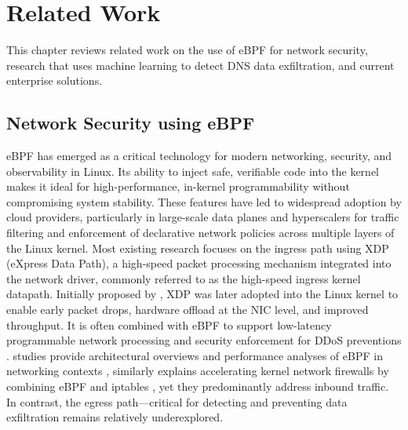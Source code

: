 \documentclass [11pt, proquest] {uwthesis}[2020/02/24]
\begin{document}
\chapter {Related Work}
This chapter reviews related work on the use of eBPF for network security, research that uses machine learning to detect DNS data exfiltration, and current enterprise solutions.

\section{Network Security using eBPF}
eBPF has emerged as a critical technology for modern networking, security, and observability in Linux. Its ability to inject safe, verifiable code into the kernel makes it ideal for high-performance, in-kernel programmability without compromising system stability. These features have led to widespread adoption by cloud providers, particularly in large-scale data planes and hyperscalers for traffic filtering and enforcement of declarative network policies across multiple layers of the Linux kernel. Most existing research focuses on the ingress path using XDP (eXpress Data Path), a high-speed packet processing mechanism integrated into the network driver, commonly referred to as the high-speed ingress kernel datapath. Initially proposed by \citeauthor{10.1145/3281411.3281443}, XDP was later adopted into the Linux kernel to enable early packet drops, hardware offload at the NIC level, and improved throughput. It is often combined with eBPF to support low-latency programmable network processing and security enforcement for DDoS preventions \cite{10.1145/3281411.3281443, 8850758}.
\citeauthor{10.1145/3371038} studies provide architectural overviews and performance analyses of eBPF in networking contexts \cite{10.1145/3371038}, similarly \citeauthor{bertrone2018accelerating} explains accelerating kernel network firewalls by combining eBPF and iptables \cite{bertrone2018accelerating}, yet they predominantly address inbound traffic. In contrast, the egress path—critical for detecting and preventing data exfiltration remains relatively underexplored. 
\end{document}
